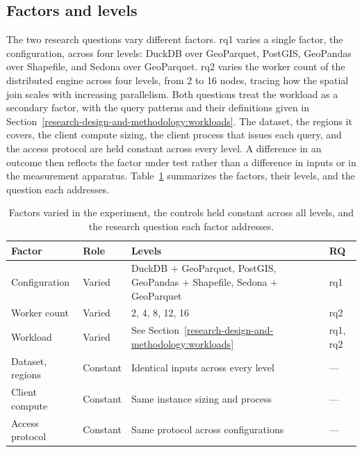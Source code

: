 \subsection{Factors and levels}
\label{research-design-and-methodology:overview-and-experimental-design:factors-and-levels}
The two research questions vary different factors. \acrshort{rq}1 varies a single factor, the configuration, across four levels: DuckDB over GeoParquet, PostGIS, GeoPandas over Shapefile, and Sedona over GeoParquet. \acrshort{rq}2 varies the worker count of the distributed engine across four levels, from \num{2} to \num{16} nodes, tracing how the spatial join scales with increasing parallelism. Both questions treat the workload as a secondary factor, with the query patterns and their definitions given in Section~\ref{research-design-and-methodology:workloads}. The dataset, the regions it covers, the client compute sizing, the client process that issues each query, and the access protocol are held constant across every level. A difference in an outcome then reflects the factor under test rather than a difference in inputs or in the measurement apparatus. Table~\ref{tab:methodology:factors} summarizes the factors, their levels, and the question each addresses.

\begin{table}[H]
    \centering
    \caption[Experimental factors and controls]{Factors varied in the experiment, the controls held constant across all levels, and the research question each factor addresses.}
    \label{tab:methodology:factors}
    \begin{tabular}{@{}l l p{6.5cm} l@{}}
        \toprule
        \textbf{Factor} & \textbf{Role} & \textbf{Levels} & \textbf{RQ} \\
        \midrule
        Configuration & Varied      & DuckDB + GeoParquet, PostGIS, GeoPandas + Shapefile, Sedona + GeoParquet & \acrshort{rq}1 \\
        Worker count  & Varied      & \num{2}, \num{4}, \num{8}, \num{12}, \num{16} & \acrshort{rq}2 \\
        Workload      & Varied      & See Section~\ref{research-design-and-methodology:workloads} & \acrshort{rq}1, \acrshort{rq}2 \\
        \midrule
        Dataset, regions & Constant & Identical inputs across every level & --- \\
        Client compute   & Constant & Same instance sizing and process & --- \\
        Access protocol  & Constant & Same protocol across configurations & --- \\
        \bottomrule
    \end{tabular}
\end{table}

